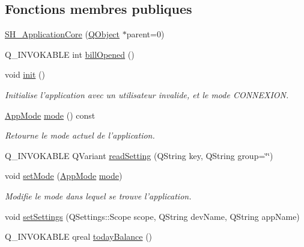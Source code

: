\subsection*{Fonctions membres publiques}
\begin{DoxyCompactItemize}
\item 
\hyperlink{classSH__ApplicationCore_a3c33fe8a39bd571c4c809d8c55603156}{S\-H\-\_\-\-Application\-Core} (\hyperlink{classQObject}{Q\-Object} $\ast$parent=0)
\item 
Q\-\_\-\-I\-N\-V\-O\-K\-A\-B\-L\-E int \hyperlink{classSH__ApplicationCore_a111103d68e1a0f1fdaeef7cd85333896}{bill\-Opened} ()
\item 
void \hyperlink{classSH__ApplicationCore_acc4f20b555300706bc08424c71c6bf02}{init} ()
\begin{DoxyCompactList}\small\item\em Initialise l'application avec un utilisateur invalide, et le mode {\itshape C\-O\-N\-N\-E\-X\-I\-O\-N}. \end{DoxyCompactList}\item 
\hyperlink{classSH__ApplicationCore_a6b93b2f83a290305f282616eb2935899}{App\-Mode} \hyperlink{classSH__ApplicationCore_a5d9ecb0e578e78d84591e36dccdf3d07}{mode} () const 
\begin{DoxyCompactList}\small\item\em Retourne le mode actuel de l'application. \end{DoxyCompactList}\item 
Q\-\_\-\-I\-N\-V\-O\-K\-A\-B\-L\-E Q\-Variant \hyperlink{classSH__ApplicationCore_a9feb9d83185f8ba1f99125b06f381436}{read\-Setting} (Q\-String key, Q\-String group=\char`\"{}\char`\"{})
\item 
void \hyperlink{classSH__ApplicationCore_a2bfe19528b27831332559d5d2cd24d25}{set\-Mode} (\hyperlink{classSH__ApplicationCore_a6b93b2f83a290305f282616eb2935899}{App\-Mode} \hyperlink{classSH__ApplicationCore_a5d9ecb0e578e78d84591e36dccdf3d07}{mode})
\begin{DoxyCompactList}\small\item\em Modifie le mode dans lequel se trouve l'application. \end{DoxyCompactList}\item 
void \hyperlink{classSH__ApplicationCore_a04f612b13a53b442a94c66598eea2907}{set\-Settings} (Q\-Settings\-::\-Scope scope, Q\-String dev\-Name, Q\-String app\-Name)
\item 
Q\-\_\-\-I\-N\-V\-O\-K\-A\-B\-L\-E qreal \hyperlink{classSH__ApplicationCore_ac6ebc8bb079a1faf430129bf7922b65d}{today\-Balance} ()

\end{DoxyCompactItemize}
